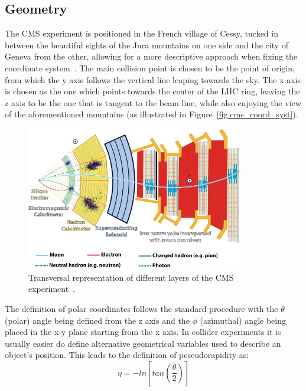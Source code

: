 \subsection{Geometry}
\label{sec:geometry}
\hspace{10pt} The CMS experiment is positioned in the French village of Cessy, tucked in between the beautiful sights of the Jura mountains on one side and the city of Geneva from the other, allowing for a more descriptive approach when fixing the coordinate system~\cite{cms:tdr}. The main collision point is chosen to be the point of origin, from which the y axis follows the vertical line leaping towards the sky. The x axis is chosen as the one which points towards the center of the LHC ring, leaving the z axis to be the one that is tangent to the beam line, while also enjoying the view of the aforementioned mountains (as illustrated in Figure~\ref{fig:cms_coord_syst}).
\begin{figure}[htbp]
  \centering
    \includegraphics[width=0.85\textwidth]{CMS_experiment/CMSslice_whiteBackground.png}
  \caption[Transversal representation of different layers of the CMS experiment.]{Transversal representation of different layers of the CMS experiment~\cite{zCMS_slice}.}
  \label{fig:cms_slice}
\end{figure}
The definition of polar coordinates follows the standard procedure with the $\theta$ (polar) angle being defined from the z axis and the $\phi$ (azimuthal) angle being placed in the x-y plane starting from the x axis. In collider experiments it is usually easier do define alternative geometrical variables used to describe an object's position. This leads to the definition of peseudorapidity as: 
\begin{equation}
\eta = -ln\left [tan\left (\frac{\theta}{2}\right ) \right]
\end{equation}
